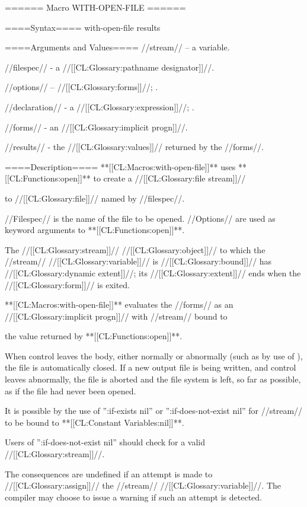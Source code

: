 ====== Macro WITH-OPEN-FILE ======

====Syntax====
\DefmacWithValuesNewline with-open-file {  } {results}

====Arguments and Values====
//stream// -- a variable.

//filespec// - a //[[CL:Glossary:pathname designator]]//.

//options// -- //[[CL:Glossary:forms]]//; \eval.

//declaration// - a  //[[CL:Glossary:expression]]//; \noeval.

//forms// - an //[[CL:Glossary:implicit progn]]//.

//results// - the //[[CL:Glossary:values]]// returned by the //forms//.

====Description====
**[[CL:Macros:with-open-file]]** uses **[[CL:Functions:open]]** to create a //[[CL:Glossary:file stream]]//

to //[[CL:Glossary:file]]// named by //filespec//.

//Filespec// is the name of the file to be opened. //Options// are used as keyword arguments to **[[CL:Functions:open]]**.

The //[[CL:Glossary:stream]]// //[[CL:Glossary:object]]// to which the //stream// //[[CL:Glossary:variable]]// is //[[CL:Glossary:bound]]// has //[[CL:Glossary:dynamic extent]]//; its //[[CL:Glossary:extent]]// ends when the //[[CL:Glossary:form]]// is exited.

**[[CL:Macros:with-open-file]]** evaluates the //forms// as an //[[CL:Glossary:implicit progn]]// with //stream// bound to

the value returned by **[[CL:Functions:open]]**.

When control leaves the body, either normally or abnormally (such as by use of ), the file is automatically closed. If a new output file is being written, and control leaves abnormally, the file is aborted and the file system is left, so far as possible, as if the file had never been opened.

It is possible by the use of '':if-exists nil'' or '':if-does-not-exist nil'' for //stream// to be bound to **[[CL:Constant Variables:nil]]**.

Users of '':if-does-not-exist nil'' should check for a valid //[[CL:Glossary:stream]]//.

The consequences are undefined if an attempt is made to //[[CL:Glossary:assign]]// the //stream// //[[CL:Glossary:variable]]//. The compiler may choose to issue a warning if such an attempt is detected.

